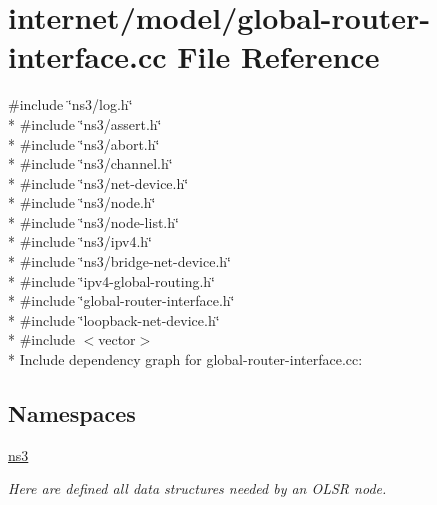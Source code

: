 \hypertarget{global-router-interface_8cc}{}\section{internet/model/global-\/router-\/interface.cc File Reference}
\label{global-router-interface_8cc}
{\ttfamily \#include \char`\"{}ns3/log.\+h\char`\"{}}\\*
{\ttfamily \#include \char`\"{}ns3/assert.\+h\char`\"{}}\\*
{\ttfamily \#include \char`\"{}ns3/abort.\+h\char`\"{}}\\*
{\ttfamily \#include \char`\"{}ns3/channel.\+h\char`\"{}}\\*
{\ttfamily \#include \char`\"{}ns3/net-\/device.\+h\char`\"{}}\\*
{\ttfamily \#include \char`\"{}ns3/node.\+h\char`\"{}}\\*
{\ttfamily \#include \char`\"{}ns3/node-\/list.\+h\char`\"{}}\\*
{\ttfamily \#include \char`\"{}ns3/ipv4.\+h\char`\"{}}\\*
{\ttfamily \#include \char`\"{}ns3/bridge-\/net-\/device.\+h\char`\"{}}\\*
{\ttfamily \#include \char`\"{}ipv4-\/global-\/routing.\+h\char`\"{}}\\*
{\ttfamily \#include \char`\"{}global-\/router-\/interface.\+h\char`\"{}}\\*
{\ttfamily \#include \char`\"{}loopback-\/net-\/device.\+h\char`\"{}}\\*
{\ttfamily \#include $<$vector$>$}\\*
Include dependency graph for global-\/router-\/interface.cc\+:
\subsection*{Namespaces}
\begin{DoxyCompactItemize}
\item 
 \hyperlink{namespacens3}{ns3}
\begin{DoxyCompactList}\small\item\em Here are defined all data structures needed by an O\+L\+SR node. \end{DoxyCompactList}\end{DoxyCompactItemize}
